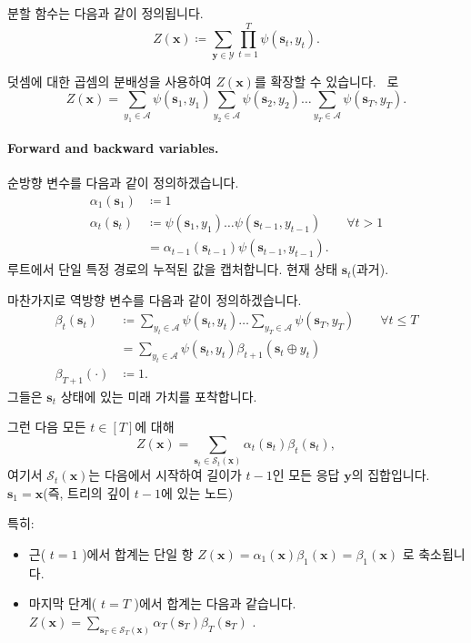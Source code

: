 \documentclass{article}
\def\s{{\bm{s}}}
\def\x{{\bm{x}}}
\def\y{{\bm{y}}}
\def\cA{{\mathcal{A}}}
\def\cS{{\mathcal{S}}}
\def\cY{{\mathcal{Y}}}
\def\augvoc{\cA}
\begin{document}
분할 함수는 다음과 같이 정의됩니다.
 \begin{equation} 
Z( \x ) \coloneqq \sum _{ \y \in \cY } \prod _{t=1}^T \psi ( \s _t, y_t).
 \end{equation}

덧셈에 대한 곱셈의 분배성을 사용하여 $Z(\x)$를 확장할 수 있습니다. 
~로
 \begin{equation} 
Z( \x ) = 
 \sum _{y_1 \in \augvoc } \psi ( \s _1, y_1) 
 \sum _{y_2 \in \augvoc } \psi ( \s _2, y_2)
 \dots 
 \sum _{y_T \in \augvoc } \psi ( \s _T, y_T).
 \end{equation}

\paragraph{Forward and backward variables.}

순방향 변수를 다음과 같이 정의하겠습니다.
 \begin{align} 
 \alpha _1( \s _1) & \coloneqq 1 \\
 \alpha _t( \s _t) & \coloneqq \psi ( \s _1, y_1) \dots \psi ( \s _{t-1}, y_{t-1}) \qquad \forall t > 1 \\
               &= \alpha _{t-1}( \s _{t-1}) \psi ( \s _{t-1}, y_{t-1}) \label{eq:alpha_recursive} .
 \end{align} 
루트에서 단일 특정 경로의 누적된 값을 캡처합니다.
현재 상태 $\s_t$(과거).

마찬가지로 역방향 변수를 다음과 같이 정의하겠습니다.
 \begin{align} 
 \beta _t( \s _t) & \coloneqq \sum _{y_t \in \augvoc } \psi ( \s _t, y_t) \dots 
 \sum _{y_T \in \augvoc } \psi ( \s _T, y_T) \qquad \forall t \le T \\
&= \sum _{y_t \in \augvoc } \psi ( \s _t, y_t) \beta _{t+1}( \s _t \oplus y_t)
 \label{eq:beta_recursive} \\
 \beta _{T+1}( \cdot ) & \coloneqq 1.
 \end{align} 
그들은 $\s_t$ 상태에 있는 미래 가치를 포착합니다.

그런 다음 모든 $t \in [T]$에 대해 
 \begin{equation} 
Z( \x ) = \sum _{ \s _t \in \cS _t( \x )} \alpha _t( \s _t) \beta _t( \s _t),
 \end{equation} 
여기서 $\cS_t(\x)$는 다음에서 시작하여 길이가 $t-1$인 모든 응답 $\y$의 집합입니다.
 $\s_1 = \x$(즉, 트리의 깊이 $t-1$에 있는 노드)

특히:
 \begin{itemize} 
 \item 근( $t=1$ )에서 합계는 단일 항 $Z(\x) =
    \alpha_1(\x)\beta_1(\x) = \beta_1(\x)$ 로 축소됩니다.
 \item 마지막 단계( $t=T$ )에서 합계는 다음과 같습니다. 
     $Z(\x) = \sum_{\s_T \in \cS_T(\x)} \alpha_T(\s_T) \beta_T(\s_T)$ .
 \end{itemize}
\end{document}
